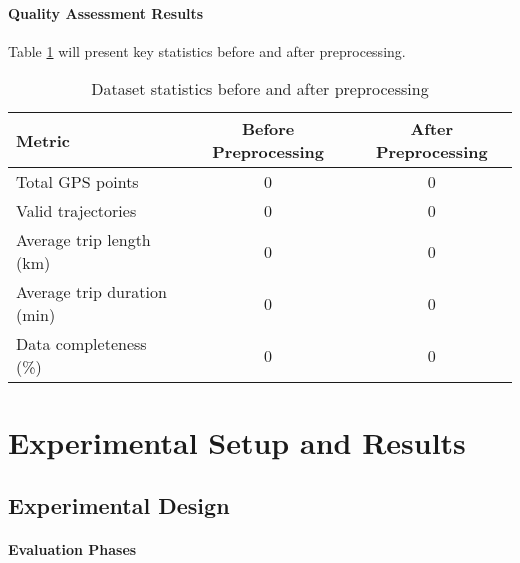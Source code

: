 \documentclass[runningheads]{llncs}
\begin{document}
\paragraph{Quality Assessment Results}

Table \ref{tab:preprocessing-stats} will present key statistics before and after preprocessing.

\begin{table}[h]
\centering
\begin{tabular}{l|c|c}
\textbf{Metric} & \textbf{Before Preprocessing} & \textbf{After Preprocessing} \\ \hline
Total GPS points & 0 & 0 \\
Valid trajectories & 0 & 0 \\
Average trip length (km) & 0 & 0 \\
Average trip duration (min) & 0 & 0 \\
Data completeness (\%) & 0 & 0 \\
\end{tabular}
\caption{Dataset statistics before and after preprocessing}
\label{tab:preprocessing-stats}
\end{table}


\section{Experimental Setup and Results}
\label{sec:evaluation}


\subsection{Experimental Design}
\label{sec:exp-design}


\paragraph{Evaluation Phases}
\end{document}
